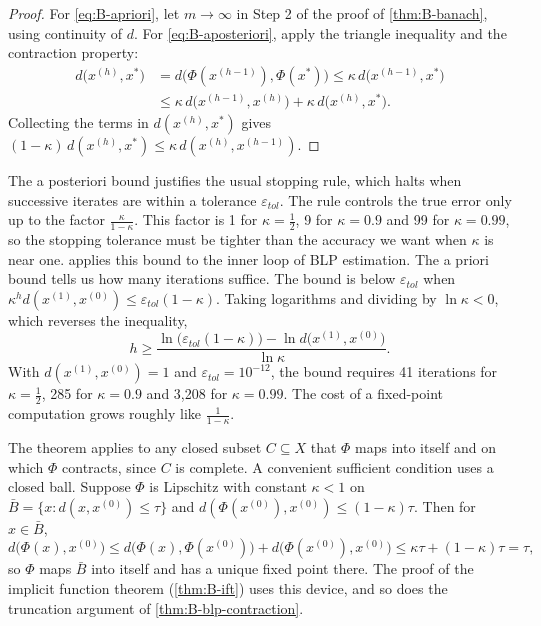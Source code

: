 \begin{proof}
For \eqref{eq:B-apriori}, let $m \to \infty$ in Step 2 of the proof of \cref{thm:B-banach}, using continuity
of $d$. For \eqref{eq:B-aposteriori}, apply the triangle inequality and the contraction property:
\begin{align*}
  d\big(x^{(h)}, x^*\big) &= d\big(\Phi(x^{(h-1)}), \Phi(x^*)\big) \leq \kappa\,d\big(x^{(h-1)}, x^*\big) \\
  &\leq \kappa\,d\big(x^{(h-1)}, x^{(h)}\big) + \kappa\,d\big(x^{(h)}, x^*\big).
\end{align*}
Collecting the terms in $d(x^{(h)}, x^*)$ gives $(1 - \kappa)\,d(x^{(h)}, x^*) \leq \kappa\,d(x^{(h)},
x^{(h-1)})$.
\end{proof}

The a posteriori bound justifies the usual stopping rule, which halts when successive iterates are within
a tolerance $\varepsilon_{tol}$. The rule controls the true error only up to the factor $\frac{\kappa}{1 -
\kappa}$. This factor is 1 for $\kappa = \frac{1}{2}$, 9 for $\kappa = 0.9$ and 99 for $\kappa = 0.99$, so the
stopping tolerance must be tighter than the accuracy we want when $\kappa$ is near one.
 applies this bound to the inner loop of BLP estimation. The a priori bound tells us
how many iterations suffice. The bound is below $\varepsilon_{tol}$ when $\kappa^h d(x^{(1)}, x^{(0)}) \leq
\varepsilon_{tol}(1 - \kappa)$. Taking logarithms and dividing by $\ln\kappa < 0$, which reverses the
inequality,
\begin{equation}\label{eq:B-iterations}
  h \geq \frac{\ln\big(\varepsilon_{tol}(1 - \kappa)\big) - \ln d\big(x^{(1)}, x^{(0)}\big)}{\ln\kappa}.
\end{equation}
With $d(x^{(1)}, x^{(0)}) = 1$ and $\varepsilon_{tol} = 10^{-12}$, the bound requires 41 iterations for $\kappa =
\frac{1}{2}$, 285 for $\kappa = 0.9$ and 3,208 for $\kappa = 0.99$. The cost of a fixed-point computation grows
roughly like $\frac{1}{1 - \kappa}$.

\begin{remark}\label{rem:B-local-contraction}
The theorem applies to any closed subset $C \subseteq X$ that $\Phi$ maps into itself and on which $\Phi$
contracts, since $C$ is complete. A convenient sufficient condition uses a closed ball. Suppose $\Phi$ is
Lipschitz with constant $\kappa < 1$ on $\bar B = \{x : d(x, x^{(0)}) \leq \tau\}$ and $d(\Phi(x^{(0)}),
x^{(0)}) \leq (1 - \kappa)\tau$. Then for $x \in \bar B$,
\begin{equation*}
  d\big(\Phi(x), x^{(0)}\big) \leq d\big(\Phi(x), \Phi(x^{(0)})\big) + d\big(\Phi(x^{(0)}), x^{(0)}\big)
  \leq \kappa\tau + (1 - \kappa)\tau = \tau,
\end{equation*}
so $\Phi$ maps $\bar B$ into itself and has a unique fixed point there. The proof of the implicit function
theorem (\cref{thm:B-ift}) uses this device, and so does the truncation argument of
\cref{thm:B-blp-contraction}.
\end{remark}

